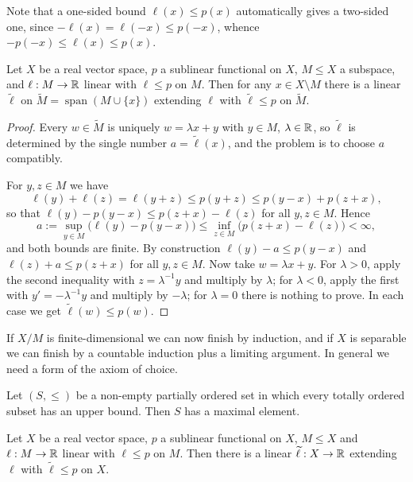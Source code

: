 \documentclass[a4paper]{scrartcl}
\newcommand{\spn}{\operatorname{span}}
\newcommand{\wt}{\widetilde}
\begin{document}
Note that a one-sided bound $\ell(x) \le p(x)$ automatically gives a two-sided one, since $-\ell(x) = \ell(-x) \le p(-x)$, whence $-p(-x) \le \ell(x) \le p(x)$.

\begin{lemma}\label{lem:banachext}
	Let $X$ be a real vector space, $p$ a sublinear functional on $X$, $M \le X$ a subspace, and $\ell : M \to \mathbb{R}$ linear with $\ell \le p$ on $M$. Then for any $x \in X \setminus M$ there is a linear $\wt\ell$ on $\wt M = \spn(M \cup \{x\})$ extending $\ell$ with $\wt\ell \le p$ on $\wt M$.
\end{lemma}

\begin{proof}
	Every $w \in \wt M$ is uniquely $w = \lambda x + y$ with $y \in M$, $\lambda \in \mathbb{R}$, so $\wt \ell$ is determined by the single number $a = \wt\ell(x)$, and the problem is to choose $a$ compatibly.

	For $y, z \in M$ we have
	$$\ell(y) + \ell(z) = \ell(y+z) \le p(y+z) \le p(y - x) + p(z+x),$$
	so that $\ell(y) - p(y-x) \le p(z+x) - \ell(z)$ for all $y,z \in M$. Hence
	$$a := \sup_{y \in M} \big( \ell(y) - p(y-x)\big) \le \inf_{z \in M}\big( p(z+x)-\ell(z)\big) < \infty,$$
	and both bounds are finite. By construction $\ell(y) - a \le p(y - x)$ and $\ell(z) + a \le p(z+x)$ for all $y, z \in M$. Now take $w = \lambda x + y$. For $\lambda > 0$, apply the second inequality with $z = \lambda^{-1}y$ and multiply by $\lambda$; for $\lambda < 0$, apply the first with $y' = -\lambda^{-1}y$ and multiply by $-\lambda$; for $\lambda = 0$ there is nothing to prove. In each case we get $\wt\ell(w) \le p(w)$.
\end{proof}

If $X/M$ is finite-dimensional we can now finish by induction, and if $X$ is separable we can finish by a countable induction plus a limiting argument. In general we need a form of the axiom of choice.

\begin{proposition}\label{prop:zorn}
	Let $(S, \le)$ be a non-empty partially ordered set in which every totally ordered subset has an upper bound. Then $S$ has a maximal element.
\end{proposition}

\begin{theorem}\label{thm:hahnbanach}
	Let $X$ be a real vector space, $p$ a sublinear functional on $X$, $M \le X$ and $\ell : M \to \mathbb{R}$ linear with $\ell \le p$ on $M$. Then there is a linear $\wt\ell : X \to \R$ extending $\ell$ with $\wt\ell \le p$ on $X$.
\end{theorem}
\end{document}
